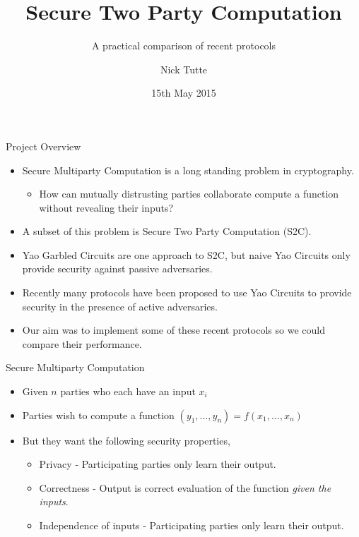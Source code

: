 \documentclass[t, 12pt]{beamer}            %
\title[Secure Two Party Computation]{Secure Two Party Computation}
\subtitle{A practical comparison of recent protocols}
\author{Nick Tutte}
\institute{University of Bristol}
\date{15th May 2015}
\begin{document}
\titlepage

\begin{frame}{Project Overview}
	\begin{itemize}[<+->]
		\item Secure Multiparty Computation is a long standing problem in cryptography.
		\begin{itemize}
			\item How can mutually distrusting parties collaborate compute a function without revealing their inputs?
		\end{itemize}
		\item A subset of this problem is Secure Two Party Computation (S2C).
		\item Yao Garbled Circuits are one approach to S2C, but naive Yao Circuits only provide security against passive adversaries. 
		\item Recently many protocols have been proposed to use Yao Circuits to provide security in the presence of active adversaries. 
		\item Our aim was to implement some of these recent protocols so we could compare their performance.
	\end{itemize}
\end{frame}


\begin{frame}{Secure Multiparty Computation}
	\begin{itemize}[<+->]
		\item Given $n$ parties who each have an input $x_i$
		\item Parties wish to compute a function $(y_1, ..., y_n) = f(x_1, ..., x_n)$
		\item But they want the following security properties,
		\begin{itemize}
			\item Privacy - Participating parties only learn their output.
			\item Correctness - Output is correct evaluation of the function \emph{given the inputs}.
			\item Independence of inputs - Participating parties only learn their output.
		\end{itemize}
	\end{itemize}
\end{frame}
\end{document}
